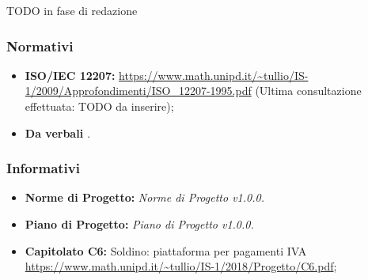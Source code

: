 TODO in fase di redazione

\subsubsection{Normativi}
\begin{itemize}
	\item \textbf{ISO/IEC 12207:} \url{https://www.math.unipd.it/~tullio/IS-1/2009/Approfondimenti/ISO_12207-1995.pdf} (Ultima consultazione effettuata: TODO da inserire);
	\item \textbf{Da verbali} \emph{.}
\end{itemize}
\subsubsection{Informativi}
\begin{itemize}
	\item \textbf{Norme di Progetto:} \emph{Norme di Progetto v1.0.0.}
	\item \textbf{Piano di Progetto:} \emph{Piano di Progetto v1.0.0.}
	\item \textbf{Capitolato C6:} Soldino: piattaforma  per pagamenti IVA \\ \url{https://www.math.unipd.it/~tullio/IS-1/2018/Progetto/C6.pdf};
	
\end{itemize}
\pagebreak